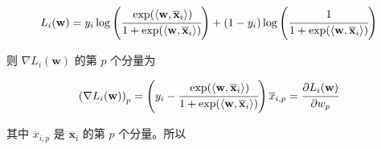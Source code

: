 \documentclass[11pt,letter,notitlepage]{article}
\begin{document}
\begin{solution}
\begin{enumerate}
		      $$L_i(\mathbf{w})=y_i \log \left( \cfrac{\exp(\langle \textbf{w},  \overline{\mathbf{x}}_i \rangle)}{1+\exp(\langle \textbf{w},  \overline{\mathbf{x}}_i \rangle) } \right) + (1-y_i)\log \left( \cfrac{1}{1+\exp(\langle \textbf{w},  \overline{\mathbf{x}}_i \rangle)} \right)$$

		      则 $\nabla L_i(\mathbf{w})$ 的第 $p$ 个分量为

		      $$\left(\nabla L_i(\mathbf{w})\right)_p=
			      \left(
			      y_i - \cfrac{\exp(\langle \textbf{w},\overline{\mathbf{x}}_i \rangle)}{1+\exp(\langle \textbf{w},\overline{\mathbf{x}}_i \rangle)}
			      \right) \overline{x}_{i,p}
			      =\cfrac{\partial L_i(\mathbf{w})}{\partial w_p}
		      $$

		      其中 $\overline{x}_{i,p}$ 是 $\overline{\mathbf{x}}_{i}$ 的第 $p$ 个分量。所以


\end{enumerate}
\end{solution}
\end{document}
